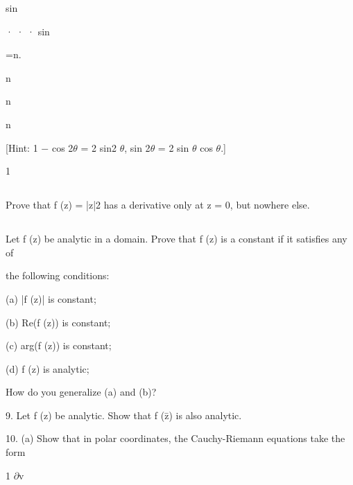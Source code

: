 sin




· · · sin




=n.




n




n




n







[Hint: 1 $-$ cos 2$\theta$ = 2 sin2 $\theta$, sin 2$\theta$ = 2 sin $\theta$ cos $\theta$.]



1






\subsection{}
Prove that f (z) = |z|2 has a derivative only at z = 0, but nowhere else.




\subsection{}
Let f (z) be analytic in a domain. Prove that f (z) is a constant if it satisfies any of

the following conditions:




(a) |f (z)| is constant;




(b) Re(f (z)) is constant;




(c) arg(f (z)) is constant;




(d) f (z) is analytic;




How do you generalize (a) and (b)?




9. Let f (z) be analytic. Show that f (z̄) is also analytic.




10. (a) Show that in polar coordinates, the Cauchy-Riemann equations take the form




1 $\partial$v




